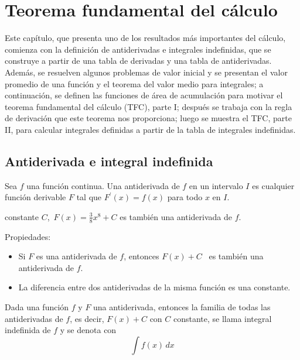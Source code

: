 \chapter{Teorema fundamental del cálculo}\label{antiderivada}

Este capítulo, que presenta uno de los resultados más importantes del cálculo, comienza con la definición de antiderivadas e integrales indefinidas, que se construye a partir de una tabla de derivadas y una tabla de antiderivadas. Además, se resuelven algunos problemas de valor inicial y se presentan el valor promedio de una función y el teorema del valor medio para integrales; a continuación, se definen las funciones de área de acumulación para motivar el teorema fundamental del cálculo (TFC), parte I; después se trabaja con la regla de derivación que este teorema nos proporciona; luego se muestra el TFC, parte II, para calcular integrales definidas a partir de la tabla de integrales indefinidas.

\section{Antiderivada e integral indefinida}

Sea $f$ una función continua. Una antiderivada de $f$ en un intervalo $I$ es cualquier función derivable $F$ tal que $F^\prime(x)=f(x)$ para todo $x$ en $I$.

\begin{ejemplo}
   constante $C$,\ $F(x)=\frac{3}{8}x^{8}+C$ es también una antiderivada de $f$.
\end{ejemplo}

Propiedades:

\begin{itemize}
  \item Si $F$ es una antiderivada de $f$, entonces $F(x) +C$ \ es también una antiderivada de $f$.

  \item La diferencia entre dos antiderivadas de la misma función es una constante.
\end{itemize}

\begin{defi}
  Dada una función $f$ y $F$ una antiderivada, entonces la familia de todas las antiderivadas de $f$, es decir, $F(x)+C$ con $C$ constante, se llama integral indefinida de $f$ y se denota con
  \[\int f(x)\,dx\]
\end{defi}

